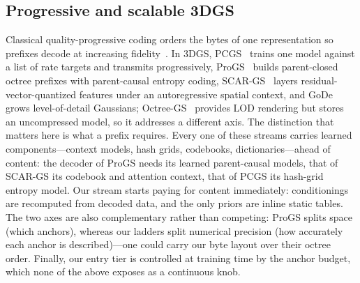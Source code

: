 \subsection{Progressive and scalable 3DGS}
Classical quality-progressive coding orders the bytes of one representation so prefixes decode at increasing fidelity~\cite{taubman2002jpeg2000}.
In 3DGS, PCGS~\cite{chen2026pcgs} trains one model against a list of rate targets and transmits progressively, ProGS~\cite{tang2026progs} builds parent-closed octree prefixes with parent-causal entropy coding, SCAR-GS~\cite{revilla2026scar} layers residual-vector-quantized features under an autoregressive spatial context, and GoDe~\cite{disario2025gode} grows level-of-detail Gaussians; Octree-GS~\cite{ren2024octree} provides LOD rendering but stores an uncompressed model, so it addresses a different axis.
The distinction that matters here is what a prefix requires.
Every one of these streams carries learned components---context models, hash grids, codebooks, dictionaries---ahead of content: the decoder of ProGS needs its learned parent-causal models, that of SCAR-GS its codebook and attention context, that of PCGS its hash-grid entropy model.
Our stream starts paying for content immediately: conditionings are recomputed from decoded data, and the only priors are inline static tables.
The two axes are also complementary rather than competing: ProGS splits space (which anchors), whereas our ladders split numerical precision (how accurately each anchor is described)---one could carry our byte layout over their octree order.
Finally, our entry tier is controlled at training time by the anchor budget, which none of the above exposes as a continuous knob.
